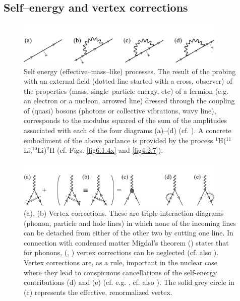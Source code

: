 \begin{subappendices}
\section{Self--energy and vertex corrections}\label{C6AppD}
 \begin{figure}
\centerline{\includegraphics*[width=10cm,angle=0]{C6/figs_C6/fig6_C1}}
\caption{Self energy (effective--mass--like) processes. The result of the probing with an external field (dotted line started with a cross, observer) of the properties (mass, single--particle energy, etc) of a fermion (e.g. an electron or a nucleon, arrowed line) dressed through the coupling of (quasi) bosons (photons or collective vibrations, wavy line), corresponds to the modulus squared of the sum of the amplitudes associated with each of the four diagrams (a)--(d) (cf. \citep{Feynman:75}). A concrete embodiment of the above parlance is provided by the process $^1$H($^{11}$Li,$^{10}$Li)$^2$H (cf. Figs. \ref{fig6.1.4x} and \ref{fig4.2.7}).}\label{fig6_D1}
\end{figure}
 \begin{figure}
\centerline{\includegraphics*[width=10cm,angle=0]{C6/figs_C6/fig6_C2}}
\caption{(a), (b) Vertex corrections. These are triple-interaction  diagrams (phonon, particle and hole lines) in which none of the incoming lines can be detached from either of the other two by cutting one line. In connection with condensed matter Migdal's theorem  (\cite{Migdal:58}) states that for phonons, (\cite{Bardeen:55},  \cite{Frohlich:52}) vertex corrections can be neglected (cf. also \cite{Anderson:64}). Vertex corrections are, as a rule, important in the nuclear case where they lead to conspicuous cancellations of the self-energy contributions (d) and (e) (cf. e.g. \cite{Bortignon:83}, cf. also \cite{Anderson:64}). The solid grey circle in (c) represents the effective, renormalized vertex. }\label{fig6_D2}
\end{figure}

\end{subappendices}
